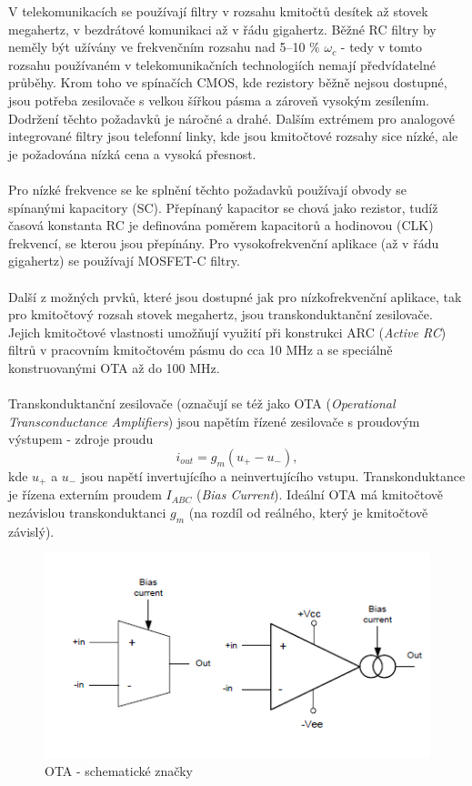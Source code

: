 V telekomunikacích se používají filtry v rozsahu kmitočtů desítek až stovek megahertz, v bezdrátové komunikaci až v řádu gigahertz. Běžné RC filtry by neměly být užívány ve frekvenčním rozsahu nad 5--10 $\%$ $\omega _c$ - tedy v tomto rozsahu používaném v telekomunikačních technologiích nemají předvídatelné průběhy. Krom toho ve spínačích CMOS, kde rezistory běžně nejsou dostupné, jsou potřeba zesilovače s velkou šířkou pásma a zároveň vysokým zesílením. Dodržení těchto požadavků je náročné a drahé. Dalším extrémem pro analogové integrované filtry jsou telefonní linky, kde jsou kmitočtové rozsahy sice nízké, ale je požadována nízká cena a vysoká přesnost.\\
\\
Pro nízké frekvence se ke splnění těchto požadavků používají obvody se spínanými kapacitory (SC). Přepínaný kapacitor se chová jako rezistor, tudíž časová konstanta RC je definována poměrem kapacitorů a hodinovou (CLK) frekvencí, se kterou jsou přepínány. Pro vysokofrekvenční aplikace (až v řádu gigahertz) se používají MOSFET-C filtry.\\
\\
Další z možných prvků, které jsou dostupné jak pro nízkofrekvenční aplikace, tak pro kmitočtový rozsah stovek megahertz, jsou transkonduktanční zesilovače. Jejich kmitočtové vlastnosti umožňují využití při konstrukci ARC (\textit{Active RC}) filtrů v pracovním kmitočtovém pásmu do cca 10 MHz a se speciálně konstruovanými OTA až do 100 MHz.\\
\\
Transkonduktanční zesilovače (označují se též jako OTA (\textit{Operational Transconductance Amplifiers}) jsou napětím řízené zesilovače s proudovým výstupem - zdroje proudu
\begin{equation}
i_{out} = g_m(u_+ - u_-),
\end{equation}
kde $u_+$ a $u_-$ jsou napětí invertujícího a neinvertujícího vstupu.  Transkonduktance je řízena externím proudem $I_{ABC}$ (\textit{Bias Current}). Ideální OTA má kmitočtově nezávislou transkonduktanci $g_m$ (na rozdíl od reálného, který je kmitočtově závislý).
\begin{figure}[h]
\centering
\includegraphics[scale=0.7]{image7.png}
\caption[OTA - schematické značky]{OTA - schematické značky \cite{4}}
\end{figure}
